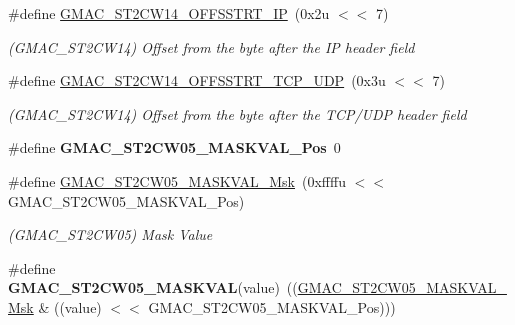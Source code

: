 \begin{DoxyCompactItemize}
\mbox{\label{group__SAMV71__GMAC_ga25bb9224c8e022802cb49d71e9407387}} 
\#define \mbox{\hyperlink{group__SAMV71__GMAC_ga25bb9224c8e022802cb49d71e9407387}{G\+M\+A\+C\+\_\+\+S\+T2\+C\+W14\+\_\+\+O\+F\+F\+S\+S\+T\+R\+T\+\_\+\+IP}}~(0x2u $<$$<$ 7)
\begin{DoxyCompactList}\small\item\em (G\+M\+A\+C\+\_\+\+S\+T2\+C\+W14) Offset from the byte after the IP header field \end{DoxyCompactList}\item 
\mbox{\label{group__SAMV71__GMAC_ga3e046597747ef937c5a082742bf057b3}} 
\#define \mbox{\hyperlink{group__SAMV71__GMAC_ga3e046597747ef937c5a082742bf057b3}{G\+M\+A\+C\+\_\+\+S\+T2\+C\+W14\+\_\+\+O\+F\+F\+S\+S\+T\+R\+T\+\_\+\+T\+C\+P\+\_\+\+U\+DP}}~(0x3u $<$$<$ 7)
\begin{DoxyCompactList}\small\item\em (G\+M\+A\+C\+\_\+\+S\+T2\+C\+W14) Offset from the byte after the T\+C\+P/\+U\+DP header field \end{DoxyCompactList}\item 
\mbox{\label{group__SAMV71__GMAC_gae8d7e5d5ffce51a8020520674b4d5917}} 
\#define {\bfseries G\+M\+A\+C\+\_\+\+S\+T2\+C\+W05\+\_\+\+M\+A\+S\+K\+V\+A\+L\+\_\+\+Pos}~0
\item 
\mbox{\label{group__SAMV71__GMAC_gac6e128d845b3bc8cc07d943e547e54a1}} 
\#define \mbox{\hyperlink{group__SAMV71__GMAC_gac6e128d845b3bc8cc07d943e547e54a1}{G\+M\+A\+C\+\_\+\+S\+T2\+C\+W05\+\_\+\+M\+A\+S\+K\+V\+A\+L\+\_\+\+Msk}}~(0xffffu $<$$<$ G\+M\+A\+C\+\_\+\+S\+T2\+C\+W05\+\_\+\+M\+A\+S\+K\+V\+A\+L\+\_\+\+Pos)
\begin{DoxyCompactList}\small\item\em (G\+M\+A\+C\+\_\+\+S\+T2\+C\+W05) Mask Value \end{DoxyCompactList}\item 
\mbox{\label{group__SAMV71__GMAC_gac89cd79ee5dee9ff479a37f86959238d}} 
\#define {\bfseries G\+M\+A\+C\+\_\+\+S\+T2\+C\+W05\+\_\+\+M\+A\+S\+K\+V\+AL}(value)~((\mbox{\hyperlink{group__SAMV71__GMAC_gac6e128d845b3bc8cc07d943e547e54a1}{G\+M\+A\+C\+\_\+\+S\+T2\+C\+W05\+\_\+\+M\+A\+S\+K\+V\+A\+L\+\_\+\+Msk}} \& ((value) $<$$<$ G\+M\+A\+C\+\_\+\+S\+T2\+C\+W05\+\_\+\+M\+A\+S\+K\+V\+A\+L\+\_\+\+Pos)))

\end{DoxyCompactItemize}
